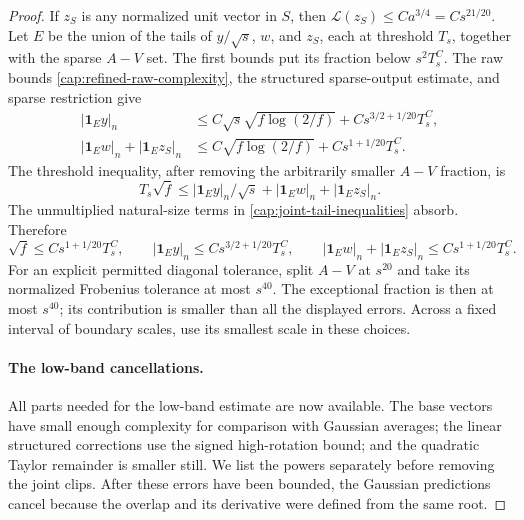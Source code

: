 \begin{proof}
If $z_S$ is any normalized unit vector in $S$, then $\mathscr L(z_S)\le
Ca^{3/4}=Cs^{21/20}$. Let $E$ be the union of the tails of $y/\sqrt s$, $w$,
and $z_S$, each at threshold $T_s$, together with the sparse $A-V$ set. The
first bounds put its fraction below \(s^2T_s^C\). The raw bounds
\eqref{cap:refined-raw-complexity}, the structured sparse-output estimate,
and sparse restriction give
\begin{equation}\label{cap:joint-tail-inequalities}
 \begin{split}
 |\mathbf1_Ey|_n&\le
 C\sqrt s\sqrt{f\log(2/f)}+Cs^{3/2+1/20}T_s^C,\\
 |\mathbf1_Ew|_n+|\mathbf1_Ez_S|_n&\le
 C\sqrt{f\log(2/f)}+Cs^{1+1/20}T_s^C.
 \end{split}
\end{equation}
The threshold inequality, after removing the arbitrarily smaller
$A-V$ fraction, is
\[
 T_s\sqrt f\le
 |\mathbf1_Ey|_n/\sqrt s
        +|\mathbf1_Ew|_n+|\mathbf1_Ez_S|_n.
\]
The unmultiplied natural-size terms in
\eqref{cap:joint-tail-inequalities} absorb.  Therefore
\begin{equation}\label{cap:joint-tail-gain}
 \sqrt f\le Cs^{1+1/20}T_s^C,\qquad
 |\mathbf1_Ey|_n\le Cs^{3/2+1/20}T_s^C,\qquad
 |\mathbf1_Ew|_n+|\mathbf1_Ez_S|_n
                       \le Cs^{1+1/20}T_s^C.
\end{equation}
For an explicit permitted diagonal tolerance, split $A-V$ at $s^{20}$ and take
its normalized Frobenius tolerance at most $s^{40}$. The exceptional fraction
is then at most $s^{40}$; its contribution is smaller than all the displayed
errors. Across a fixed interval of boundary scales, use its smallest scale in
these choices.

\paragraph{The low-band cancellations.}
All parts needed for the low-band estimate are now available. The base
vectors have small enough complexity for comparison with Gaussian
averages; the linear structured corrections use the signed high-rotation
bound; and the quadratic Taylor remainder is smaller still. We list the
powers separately before removing the joint clips. After these errors have
been bounded, the Gaussian predictions cancel because the overlap and its
derivative were defined from the same root.



\end{proof}
